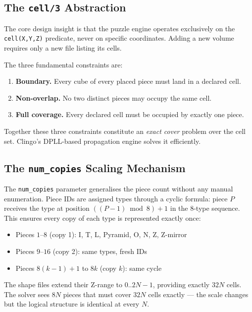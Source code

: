 \documentclass[12pt,a4paper]{article}
\begin{document}
\subsection{The \texttt{cell/3} Abstraction}

The core design insight is that the puzzle engine operates exclusively on the
\texttt{cell(X,Y,Z)} predicate, never on specific coordinates.  Adding a new
volume requires only a new file listing its cells.

The three fundamental constraints are:

\begin{enumerate}[leftmargin=1.8em, label=\textbf{(\arabic*)}]
  \item \textbf{Boundary.}  Every cube of every placed piece must land in a
        declared cell.
  \item \textbf{Non-overlap.}  No two distinct pieces may occupy the same cell.
  \item \textbf{Full coverage.}  Every declared cell must be occupied by exactly
        one piece.
\end{enumerate}

Together these three constraints constitute an \emph{exact cover} problem over
the cell set.  Clingo's DPLL-based propagation engine solves it efficiently.

\subsection{The \texttt{num\_copies} Scaling Mechanism}

The \texttt{num\_copies} parameter generalises the piece count without any
manual enumeration.  Piece IDs are assigned types through a cyclic formula:
piece $P$ receives the type at position $((P-1) \bmod 8) + 1$ in the
8-type sequence.  This ensures every copy of each type is represented exactly
once:

\begin{itemize}[leftmargin=1.8em]
  \item Pieces $1$--$8$ (copy 1): I, T, L, Pyramid, O, N, Z, Z-mirror
  \item Pieces $9$--$16$ (copy 2): same types, fresh IDs
  \item Pieces $8(k{-}1){+}1$ to $8k$ (copy $k$): same cycle
\end{itemize}

The shape files extend their Z-range to $0..2N{-}1$, providing exactly $32N$
cells.  The solver sees $8N$ pieces that must cover $32N$ cells exactly ---
the scale changes but the logical structure is identical at every $N$.
\end{document}
